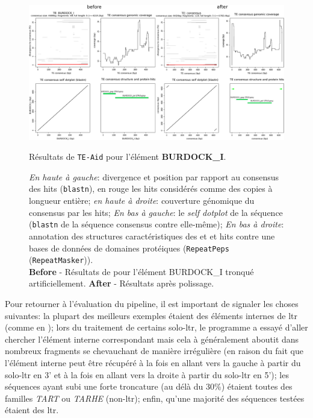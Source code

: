 \documentclass[10pt]{article}
\begin{document}
\begin{figure}[h]
    \centering
\includegraphics[width=\textwidth]{img/plots/burdock.eps}
    \caption{Résultats de \texttt{TE-Aid} pour l'élément \textbf{BURDOCK\_I}.}
    \caption*{\scriptsize
    \textit{En haute à gauche}: divergence et position par rapport au consensus des hits (\texttt{blastn}), en rouge les hits considérés comme des copies à longueur entière; \textit{en haute à droite}: couverture génomique du consensus par les hits; \textit{En bas à gauche}: le \textit{self dotplot} de la séquence (\texttt{blastn} de la séquence consensus contre elle-même); \textit{En bas à droite}: annotation des structures caractéristiques des \acrshort{et} et hits contre une bases de données de domaines protéiques (\texttt{RepeatPeps} (\texttt{RepeatMasker})). \\
    \textbf{Before} - Résultats de pour l'élément BURDOCK\_I tronqué artificiellement. \textbf{After} - Résultats après polissage.
    }
    \label{fig:BURDOCK}
\end{figure}

\bigskip

Pour retourner à l'évaluation du pipeline, il est important de signaler les choses suivantes: la plupart des meilleurs exemples étaient des éléments internes de \acrshort{ltr} (comme en \figureautorefname{ \ref{fig:BURDOCK}}); lors du traitement de certains solo-\acrshort{ltr}, le programme a essayé d'aller chercher l'élément interne correspondant mais cela à généralement aboutit dans nombreux fragments se chevauchant de manière irrégulière (en raison du fait que l'élément interne peut être récupéré à la fois en allant vers la gauche à partir du solo-\acrshort{ltr} en 3' et à la fois en allant vers la droite à partir du solo-\acrshort{ltr} en 5'); les séquences ayant subi une forte troncature (au délà du 30\%) étaient toutes des familles \textit{TART} ou \textit{TARHE} (non-\acrshort{ltr}); enfin, qu'une majorité des séquences testées étaient des \acrshort{ltr}. \\ 
\end{document}
